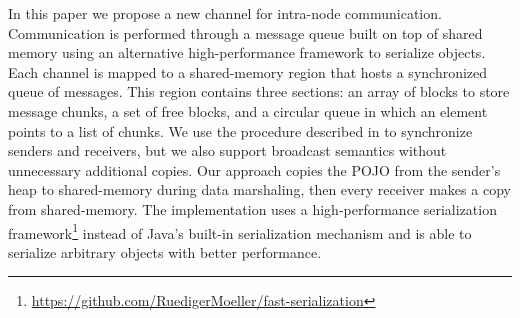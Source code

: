 In this paper we propose a new channel for intra-node communication.
Communication is performed through a message queue built on top of shared memory using an alternative high-performance framework to serialize objects.
Each channel is mapped to a shared-memory region that hosts a synchronized queue of messages.
This region contains three sections: an array of blocks to store message chunks, 
a set of free blocks, and a circular queue in which an element points to a list of chunks.
We use the procedure described in \cite{Unrau:708530} to synchronize senders and receivers, but we also support broadcast semantics without unnecessary additional copies.
Our approach copies the POJO from the sender's heap to shared-memory during data marshaling, then every receiver makes a copy from shared-memory.
The implementation uses a high-performance serialization framework\footnote{\url{https://github.com/RuedigerMoeller/fast-serialization}}
instead of Java's built-in serialization mechanism
and is able to serialize arbitrary objects with better performance.
